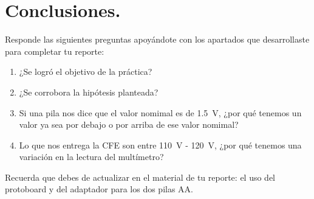 \documentclass[14pt]{extarticle}
\begin{document}
\section{Conclusiones.}

Responde las siguientes preguntas apoyándote con los apartados que desarrollaste para completar tu reporte:
\begin{enumerate}
\item ¿Se logró el objetivo de la práctica?
\item ¿Se corrobora la hipótesis planteada?
\item Si una pila nos dice que el valor nomimal es de \SI{1.5}{\volt}, ¿por qué tenemos un valor ya sea por debajo o por arriba de ese valor nomimal?
\item Lo que nos entrega la CFE son entre \SI{110}{\volt} - \SI{120}{\volt}, ¿por qué tenemos una variación en la lectura del multímetro?
\end{enumerate}

Recuerda que debes de actualizar en el material de tu reporte: el uso del protoboard y del adaptador para los dos pilas AA.
\end{document}
